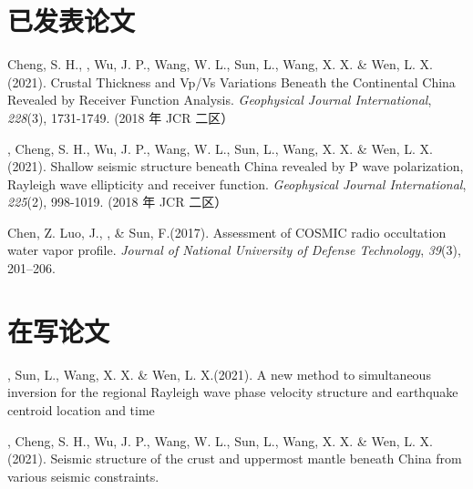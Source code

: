 \newcommand{\Revision}{\textit{under revision}}
\newcommand{\CS}{*} %
\newcommand{\CF}{\textsuperscript{\#}} %


\section*{已发表论文}

\begin{etaremune}
\item
    Cheng, S. H., \Xiao, Wu, J. P., Wang, W. L., Sun, L., Wang, X. X. \& Wen, L. X.(2021).
    Crustal Thickness and Vp/Vs Variations Beneath the Continental China Revealed by Receiver Function Analysis.
    \textit{Geophysical Journal International}, \textit{228}(3), 1731-1749. (2018 年 JCR 二区）
\item
    \Xiao, Cheng, S. H., Wu, J. P., Wang, W. L., Sun, L., Wang, X. X. \& Wen, L. X.(2021).
    Shallow seismic structure beneath China revealed by P wave polarization, Rayleigh wave ellipticity and receiver function.
    \textit{Geophysical Journal International}, \textit{225}(2), 998-1019. (2018 年 JCR 二区）
\item
    Chen, Z. Luo, J.,  \Xiao, \& Sun, F.(2017).
    Assessment of COSMIC radio occultation water vapor profile.
    \textit{Journal of National University of Defense Technology}, \textit{39}(3), 201--206. 
\end{etaremune}


\section*{在写论文}
\begin{etaremune}
\item
    \Xiao, Sun, L., Wang, X. X. \& Wen, L. X.(2021).
    A new method to simultaneous inversion for the regional Rayleigh wave phase velocity structure and earthquake centroid location and time
\item
    \Xiao, Cheng, S. H., Wu, J. P., Wang, W. L., Sun, L., Wang, X. X. \& Wen, L. X.(2021).
    Seismic structure of the crust and uppermost mantle beneath China from various seismic constraints.
\end{etaremune}

